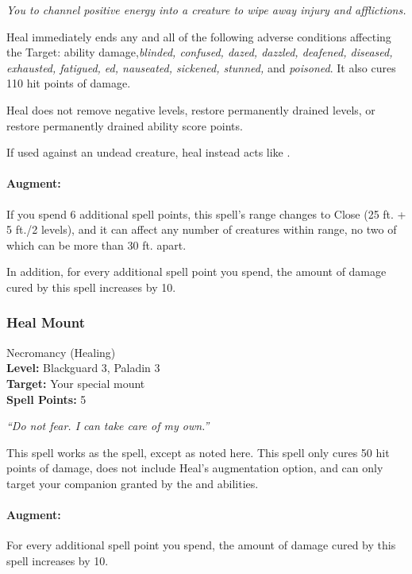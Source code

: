 \emph{You to channel positive energy into a creature to wipe away injury and afflictions.} 

Heal immediately ends any and all of the following adverse conditions affecting the Target: 
ability damage,\emph{blinded, confused, dazed, dazzled, deafened, diseased, exhausted, fatigued, ed, nauseated, sickened, stunned,} and \emph{poisoned}.
It also cures 110 hit points of damage.

Heal does not remove negative levels, restore permanently drained levels, or restore permanently drained ability score points.

If used against an undead creature, heal instead acts like .

\paragraph{Augment:} If you spend 6 additional spell points, 
this spell's range changes to Close (25 ft. + 5 ft./2 levels), and it can affect any number of creatures within range,
no two of which can be more than 30 ft. apart.

In addition, for every additional spell point you spend, the amount of damage cured by this spell increases by 10.

\subsubsection{Heal Mount}
\label{Spell:HealMount}
Necromancy (Healing)
\\ \textbf{Level:} Blackguard 3, Paladin 3
\\ \textbf{Target:} Your special mount
\\ \textbf{Spell Points:} 5

\emph{``Do not fear. I can take care of my own.''}

This spell works as the  spell, except as noted here. 
This spell only cures 50 hit points of damage, does not include Heal's augmentation option, and can only target your companion granted by the  and  abilities.

\paragraph{Augment:} For every additional spell point you spend, the amount of damage cured by this spell increases by 10.

